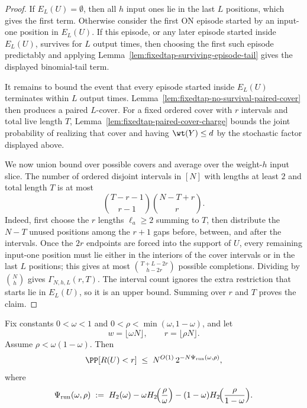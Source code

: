 \begin{proof}
If \(E_L(U)=\emptyset\), then all \(h\) input ones lie in the last \(L\) positions, which gives the first term.
Otherwise consider the first ON episode started by an input-one position in \(E_L(U)\). If this episode, or any later
episode started inside \(E_L(U)\), survives for \(L\) output times, then choosing the first such episode predictably and
applying Lemma~\ref{lem:fixedtap-surviving-episode-tail} gives the displayed binomial-tail term.

It remains to bound the event that every episode started inside \(E_L(U)\) terminates within \(L\) output times.
Lemma~\ref{lem:fixedtap-no-survival-paired-cover} then produces a paired \(L\)-cover. For a fixed ordered cover with
\(r\) intervals and total live length \(T\), Lemma~\ref{lem:fixedtap-paired-cover-charge} bounds the joint probability
of realizing that cover and having \(\wt(Y)\le d\) by the stochastic factor displayed above.

We now union bound over possible covers and average over the weight-\(h\) input slice. The number of ordered disjoint
intervals in \([N]\) with lengths at least \(2\) and total length \(T\) is at most
\[
\binom{T-r-1}{r-1}\binom{N-T+r}{r}.
\]
Indeed, first choose the \(r\) lengths \(\ell_a\ge2\) summing to \(T\), then distribute the \(N-T\) unused positions
among the \(r+1\) gaps before, between, and after the intervals. Once the \(2r\) endpoints are forced into the support
of \(U\), every remaining input-one position must lie either in the interiors of the cover intervals or in the last
\(L\) positions; this gives at most \(\binom{T+L-2r}{h-2r}\) possible completions. Dividing by \(\binom{N}{h}\) gives
\(\Gamma_{N,h,L}(r,T)\). The interval count ignores the extra restriction that starts lie in \(E_L(U)\), so it is an
upper bound. Summing over \(r\) and \(T\) proves the claim.
\end{proof}

\begin{lemma}
\label{lem:run-lower-tail-entropy}
Fix constants \(0<\omega<1\) and \(0<\rho<\min(\omega,1-\omega)\), and let
\[
w=\lfloor \omega N\rfloor,
\qquad
r=\lfloor \rho N\rfloor.
\]
Assume \(\rho<\omega(1-\omega)\). Then
\begin{equation}
\label{eq:run-lower-tail-entropy}
\PP[R(U)<r]
\;\le\;
N^{O(1)}\,2^{-N\Psi_{\mathrm{run}}(\omega,\rho)},
\end{equation}
where
\begin{equation}
\label{eq:run-rate-function}
\Psi_{\mathrm{run}}(\omega,\rho)
\;:=\;
H_2(\omega)
- \omega H_2\!\Bigl(\frac{\rho}{\omega}\Bigr)
- (1-\omega)H_2\!\Bigl(\frac{\rho}{1-\omega}\Bigr).
\end{equation}
\end{lemma}

